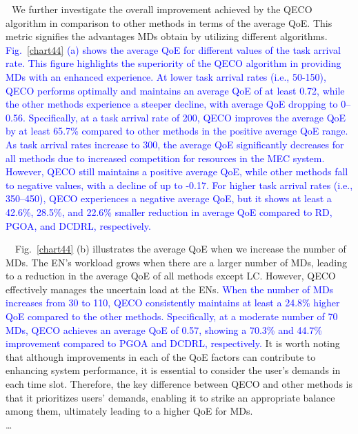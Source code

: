 \documentclass[12pt,draftclsnofoot,onecolumn]{IEEEtran}
\newenvironment{my}[2]%
{\begin{list}{}%
{\setlength{\rightmargin}{#1}\setlength{\leftmargin}{#2}}%


 \item[]{}

} {\end{list}}
\begin{document}
\begin{enumerate}
\begin{my}{1cm}{1cm}
{{\,\,\,\,We further investigate the overall improvement achieved by the QECO algorithm in comparison to other methods in terms of the average QoE. This metric signifies the advantages MDs obtain by utilizing different algorithms. \textcolor{blue}{Fig.~\ref{chart44} (a) shows the average QoE for different values of the task arrival rate. This figure highlights the superiority of the QECO algorithm in providing MDs with an enhanced experience. At lower task arrival rates (i.e., 50-150), QECO performs optimally and maintains an average QoE of at least 0.72, while the other methods experience a steeper decline, with average QoE dropping to 0--0.56. Specifically, at a task arrival rate of 200, QECO improves the average QoE by at least 65.7\% compared to other methods in the positive average QoE range. As task arrival rates increase to 300, the average QoE significantly decreases for all methods due to increased competition for resources in the MEC system. However, QECO still maintains a positive average QoE, while other methods fall to negative values, with a decline of up to -0.17. For higher task arrival rates (i.e., 350–450), QECO experiences a negative average QoE, but it shows at least a 42.6\%, 28.5\%, and 22.6\% smaller reduction in average QoE compared to RD, PGOA, and DCDRL, respectively.} \vspace{3mm}



\,\,\,\, Fig.~\ref{chart44} (b) illustrates the average QoE when we increase the number of MDs. The EN's workload grows when there are a larger number of MDs, leading to a reduction in the average QoE of all methods except LC. However, QECO effectively manages the uncertain load at the ENs. \textcolor{blue}{When the number of MDs increases from 30 to 110, QECO consistently maintains at least a 24.8\% higher QoE compared to the other methods. Specifically, at a moderate number of 70 MDs, QECO achieves an average QoE of 0.57, showing a 70.3\% and 44.7\% improvement compared to PGOA and DCDRL, respectively.} It is worth noting that although improvements in each of the QoE factors can contribute to enhancing system performance, it is essential to consider the user's demands in each time slot. Therefore, the key difference between QECO and other methods is that it prioritizes users' demands, enabling it to strike an appropriate balance among them, ultimately leading to a higher QoE for MDs.
 \vspace{3mm}\\\dots }}

\end{my}\vspace{6mm}







\end{enumerate}
\end{document}
